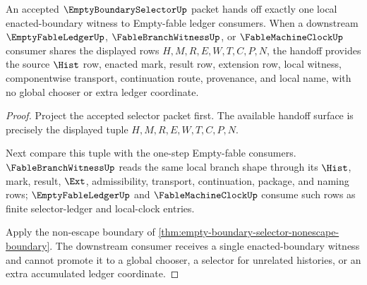 \begin{theorem}
\label{thm:empty-boundary-selector-ledger-handoff}
An accepted $\EmptyBoundarySelectorUp$ packet hands off exactly one local enacted-boundary witness to Empty-fable ledger consumers. When a downstream $\EmptyFableLedgerUp$, $\FableBranchWitnessUp$, or $\FableMachineClockUp$ consumer shares the displayed rows $H,M,R,E,W,T,C,P,N$, the handoff provides the source $\Hist$ row, enacted mark, result row, extension row, local witness, componentwise transport, continuation route, provenance, and local name, with no global chooser or extra ledger coordinate.
\end{theorem}
\begin{proof}
Project the accepted selector packet first. The available handoff surface is precisely the displayed tuple $H,M,R,E,W,T,C,P,N$.

Next compare this tuple with the one-step Empty-fable consumers. $\FableBranchWitnessUp$ reads the same local branch shape through its $\Hist$, mark, result, $\Ext$, admissibility, transport, continuation, package, and naming rows; $\EmptyFableLedgerUp$ and $\FableMachineClockUp$ consume such rows as finite selector-ledger and local-clock entries.

Apply the non-escape boundary of \autoref{thm:empty-boundary-selector-nonescape-boundary}. The downstream consumer receives a single enacted-boundary witness and cannot promote it to a global chooser, a selector for unrelated histories, or an extra accumulated ledger coordinate.
\end{proof}

